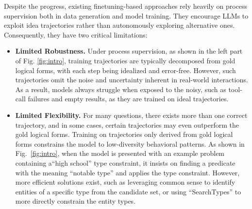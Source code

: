 Despite the progress, existing finetuning-based approaches rely heavily on process supervision both in data generation and model training. They encourage LLMs to exploit idea trajectories rather than autonomously exploring alternative ones. Consequently, they have two critical limitations: 
\begin{itemize}[leftmargin=*]
\item  \textbf{Limited Robustness.} Under process supervision, as shown in the left part of Fig. \ref{fig:intro}, training trajectories are typically decomposed from gold logical forms, with each step being idealized and error-free. However, such trajectories omit the noise and uncertainty inherent in real-world interactions. As a result, models always struggle when exposed to the noisy, such as tool-call failures and empty results, as they are trained on ideal trajectories. 
\item \textbf{Limited Flexibility.} For many questions, there exists more than one correct trajectory, and in some cases, certain trajectories may even outperform the gold logical forms. Training on trajectories only derived from gold logical forms constrains the model to low-diversity behavioral patterns. As shown in Fig.~\ref{fig:intro}, when the model is presented with an example problem containing a``high school'' type constraint, it insists on finding a predicate with the meaning ``notable type'' and applies the type constraint. However, more efficient solutions exist, such as leveraging common sense to identify entities of a specific type from the candidate set, or using ``SearchTypes'' to more directly constrain the entity types.
\end{itemize}


